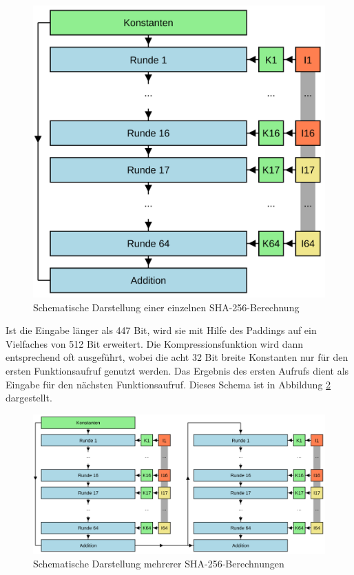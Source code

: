 \begin{figure}[!h]
  \centering
  \includegraphics[scale=0.4]{images/sha256single}
  \caption{Schematische Darstellung einer einzelnen SHA-256-Berechnung}
  \label{fig:sha256single}
\end{figure}

Ist die Eingabe länger als 447 Bit, wird sie mit Hilfe des Paddings auf ein Vielfaches von 512 Bit erweitert. Die Kompressionsfunktion wird dann entsprechend oft
ausgeführt, wobei die acht 32 Bit breite Konstanten nur für den ersten Funktionsaufruf genutzt werden. Das Ergebnis des ersten Aufrufs dient als Eingabe für
den nächsten Funktionsaufruf. Dieses Schema ist in Abbildung \ref{fig:sha256multi} dargestellt.

\begin{figure}[!h]
  \centering
  \includegraphics[scale=0.4]{images/sha256multi}
  \caption{Schematische Darstellung mehrerer SHA-256-Berechnungen}
  \label{fig:sha256multi}
\end{figure}





